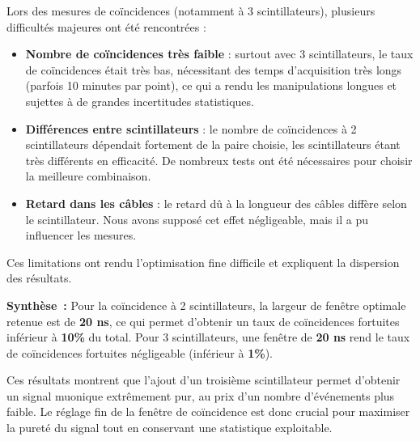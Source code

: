 \documentclass[a4paper,12pt,twoside]{article}
\begin{document}

\vspace{1em}
\begin{center}
\begin{tcolorbox}[colback=red!5!white, colframe=red!80!black, title=Problèmes rencontrés lors des mesures de coïncidences]
Lors des mesures de coïncidences (notamment à 3 scintillateurs), plusieurs difficultés majeures ont été rencontrées :
\begin{itemize}
    \item \textbf{Nombre de coïncidences très faible} : surtout avec 3 scintillateurs, le taux de coïncidences était très bas, nécessitant des temps d'acquisition très longs (parfois 10 minutes par point), ce qui a rendu les manipulations longues et sujettes à de grandes incertitudes statistiques.
    \item \textbf{Différences entre scintillateurs} : le nombre de coïncidences à 2 scintillateurs dépendait fortement de la paire choisie, les scintillateurs étant très différents en efficacité. De nombreux tests ont été nécessaires pour choisir la meilleure combinaison.
    \item \textbf{Retard dans les câbles} : le retard dû à la longueur des câbles diffère selon le scintillateur. Nous avons supposé cet effet négligeable, mais il a pu influencer les mesures.
\end{itemize}
Ces limitations ont rendu l’optimisation fine difficile et expliquent la dispersion des résultats.
\end{tcolorbox}
\end{center}


\begin{remarque}
\textbf{Synthèse~:} Pour la coïncidence à 2 scintillateurs, la largeur de fenêtre optimale retenue est de \textbf{20 ns}, ce qui permet d’obtenir un taux de coïncidences fortuites inférieur à \textbf{10\%} du total. Pour 3 scintillateurs, une fenêtre de \textbf{20 ns} rend le taux de coïncidences fortuites négligeable (inférieur à \textbf{1\%}).

Ces résultats montrent que l’ajout d’un troisième scintillateur permet d’obtenir un signal muonique extrêmement pur, au prix d’un nombre d’événements plus faible. Le réglage fin de la fenêtre de coïncidence est donc crucial pour maximiser la pureté du signal tout en conservant une statistique exploitable.
\end{remarque}
\end{document}
